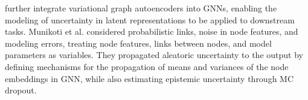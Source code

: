 \cite{hajiramezanali2019variational,sun2021hyperbolic} further integrate variational graph autoencoders into GNNs, enabling the modeling of uncertainty in latent representations to be applied to downstream tasks.
Munikoti et al. \cite{munikoti2023general} considered probabilistic links, noise in node features, and modeling errors, treating node features, links between nodes, and model parameters as variables. They propagated aleatoric uncertainty to the output by defining mechanisms for the propagation of means and variances of the node embeddings in GNN, while also estimating epistemic uncertainty through MC dropout. 




